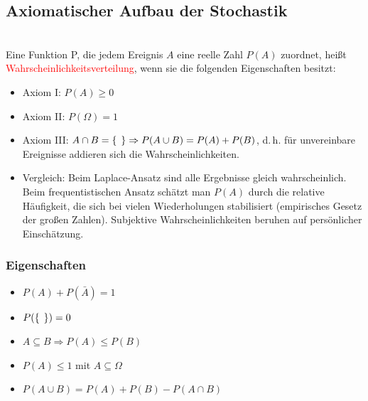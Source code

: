 \subsection{Axiomatischer Aufbau der Stochastik}\\
Eine Funktion P, die jedem Ereignis $A$ eine reelle Zahl $P(A)$ zuordnet, heißt \textcolor{red}{Wahrscheinlichkeitsverteilung}, wenn sie die folgenden Eigenschaften besitzt: 
\begin{itemize}
    \item Axiom I: $P(A) \geq 0$
    \item Axiom II: $P(\Omega) = 1$ 
    \item Axiom III: $A\cap B = \{ \hspace{0.15cm} \} \Rightarrow P(A\cup B) = P(A) + P(B)$, d.\,h. für unvereinbare Ereignisse addieren sich die Wahrscheinlichkeiten.
    \item Vergleich: Beim Laplace-Ansatz sind alle Ergebnisse gleich wahrscheinlich. Beim frequentistischen Ansatz schätzt man $P(A)$ durch die relative Häufigkeit, die sich bei vielen Wiederholungen stabilisiert (empirisches Gesetz der großen Zahlen). Subjektive Wahrscheinlichkeiten beruhen auf persönlicher Einschätzung.
\end{itemize}
\subsubsection{Eigenschaften}
\begin{itemize}
    \item $P(A) + P(\bar{A}) = 1$
    \item $P(\{ \hspace{0.15cm} \}) = 0 $
    \item $A\subseteq B \Rightarrow  P(A) \leq P(B)$
    \item $P(A) \leq 1$ mit $A\subseteq \Omega$
    \item $P(A \cup B) = P(A) + P(B) - P(A\cap B)$
\end{itemize}
